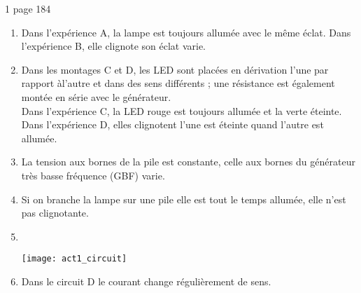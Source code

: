 \begin{myact}{1 page 184}
	\begin{enumerate}
		\item Dans l'expérience A, la lampe est toujours allumée avec le même éclat. Dans l'expérience B, elle clignote son éclat varie.\pause
		\item Dans les montages C et D, les LED sont placées en dérivation l'une par rapport àl'autre et dans des sens différents ; une résistance est également montée en série avec le générateur.\\
		Dans l'expérience C, la LED rouge est toujours allumée et la verte éteinte. Dans l'expérience D, elles clignotent l'une est éteinte quand l'autre est allumée.
		\item La tension aux bornes de la pile est constante, celle aux bornes du générateur très basse fréquence (GBF) varie.
		\item Si on branche la lampe sur une pile elle est tout le temps allumée, elle n'est pas clignotante.
		\item \ \begin{center}
			\texttt{[image: act1\_circuit]}
		\end{center}
		\item Dans le circuit D le courant change régulièrement de sens.
		
	\end{enumerate}
\end{myact}